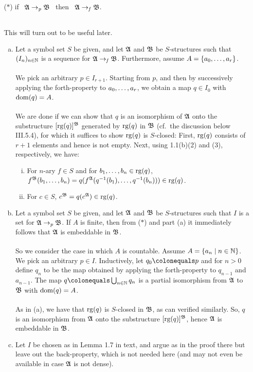 \begin{enumerate}[1.]
\begin{quoteno}{($\ast$)}
if \ $\struct{A} \partemb \struct{B}$ \ then \ $\struct{A} \finemb \struct{B}$.
\end{quoteno}\smallskip\\
This will turn out to be useful later.
\begin{enumerate}[(a)]
\item Let a symbol set $S$ be given, and let $\struct{A}$ and $\struct{B}$ be $S$-structures such that $(I_n)_{n \in \nat}$ is a sequence for $\struct{A} \finemb \struct{B}$. Furthermore, assume $A = \{\seq{a}{r}\}$.\\
\ \\
We pick an arbitrary $p \in I_{r + 1}$. Starting from $p$, and then by successively applying the forth-property to $\seq{a}{r}$, we obtain a map $q \in I_0$ with $\dom{q} = A$.\\
\ \\
We are done if we can show that $q$ is an isomorphism of $\struct{A}$ onto the substructure $[\rg{q}]^\struct{B}$ generated by $\rg{q}$ in $\struct{B}$ (cf.\ the discussion below III.5.4), for which it suffices to show $\rg{q}$ is $S$-closed: First, $\rg{q}$ consists of $r + 1$ elements and hence is not empty. Next, using 1.1(b)(2) and (3), respectively, we have:
\begin{enumerate}[(i)]
\item For $n$-ary $f \in S$ and for $\seq[1]{b}{n} \in \rg{q}$, $f^\struct{B} (\seq[1]{b}{n}) = q(f^\struct{A} (\seqp{q^{-1}(b_1)}{q^{-1}(b_n)})) \in \rg{q}$.
\item For $c \in S$, $c^\struct{B} = q(c^\struct{A}) \in \rg{q}$.
\end{enumerate}
\item Let a symbol set $S$ be given, and let $\struct{A}$ and $\struct{B}$ be $S$-structures such that $I$ is a set for $\struct{A} \partemb \struct{B}$. If $A$ is finite, then from ($\ast$) and part (a) it immediately follows that $\struct{A}$ is embeddable in $\struct{B}$.\\
\ \\
So we consider the case in which $A$ is countable. Assume $A = \setm{a_n}{n \in \nat}$. We pick an arbitrary $p \in I$. Inductively, let $q_0 \colonequals p$ and for $n > 0$ define $q_n$ to be the map obtained by applying the forth-property to $q_{n - 1}$ and $a_{n - 1}$. The map $q \colonequals \bigcup_{n \in \nat} q_n$ is a partial isomorphism from $\struct{A}$ to $\struct{B}$ with $\dom{q} = A$.\\
\ \\
As in (a), we have that $\rg{q}$ is $S$-closed in $\struct{B}$, as can verified similarly. So, $q$ is an isomorphism from $\struct{A}$ onto the substructure $[\rg{q}]^\struct{B}$, hence $\struct{A}$ is embeddable in $\struct{B}$.
\item Let $I$ be chosen as in Lemma 1.7 in text, and argue as in the proof there but leave out the back-property, which is not needed here (and may not even be available in case $\struct{A}$ is not dense).
\end{enumerate}
\end{enumerate}
